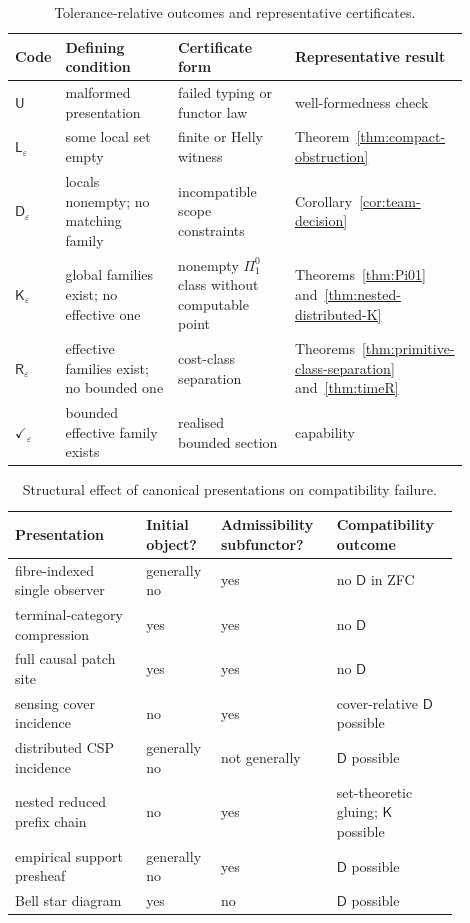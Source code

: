 \documentclass[11pt]{article}
\theoremstyle{plain}
\theoremstyle{definition}
\theoremstyle{remark}
\newcommand{\eps}{\varepsilon}
\begin{document}
\begin{table}[htbp]
\centering
\caption{Tolerance-relative outcomes and representative certificates.}
\label{tab:ladder}
\begin{tabular}{@{}p{0.09\linewidth}p{0.27\linewidth}p{0.28\linewidth}p{0.26\linewidth}@{}}
\toprule
Code & Defining condition & Certificate form & Representative result\\
\midrule
$\mathsf U$ & malformed presentation & failed typing or functor law & well-formedness check\\
$\mathsf L_\eps$ & some local set empty & finite or Helly witness & Theorem~\ref{thm:compact-obstruction}\\
$\mathsf D_\eps$ & locals nonempty; no matching family & incompatible scope constraints & Corollary~\ref{cor:team-decision}\\
$\mathsf K_\eps$ & global families exist; no effective one & nonempty $\Pi^0_1$ class without computable point & Theorems~\ref{thm:Pi01} and~\ref{thm:nested-distributed-K}\\
$\mathsf R_\eps$ & effective families exist; no bounded one & cost-class separation & Theorems~\ref{thm:primitive-class-separation} and~\ref{thm:timeR}\\
$\checkmark_\eps$ & bounded effective family exists & realised bounded section & capability\\
\bottomrule
\end{tabular}
\end{table}

\begin{table}[htbp]
\centering
\caption{Structural effect of canonical presentations on compatibility failure.}
\label{tab:presentations}
\begin{tabular}{@{}p{0.27\linewidth}p{0.14\linewidth}p{0.22\linewidth}p{0.25\linewidth}@{}}
\toprule
Presentation & Initial object? & Admissibility subfunctor? & Compatibility outcome\\
\midrule
fibre-indexed single observer & generally no & yes & no $\mathsf D$ in ZFC\\
terminal-category compression & yes & yes & no $\mathsf D$\\
full causal patch site & yes & yes & no $\mathsf D$\\
sensing cover incidence & no & yes & cover-relative $\mathsf D$ possible\\
distributed CSP incidence & generally no & not generally & $\mathsf D$ possible\\
nested reduced prefix chain & no & yes & set-theoretic gluing; $\mathsf K$ possible\\
empirical support presheaf & generally no & yes & $\mathsf D$ possible\\
Bell star diagram & yes & no & $\mathsf D$ possible\\
\bottomrule
\end{tabular}
\end{table}
\end{document}
